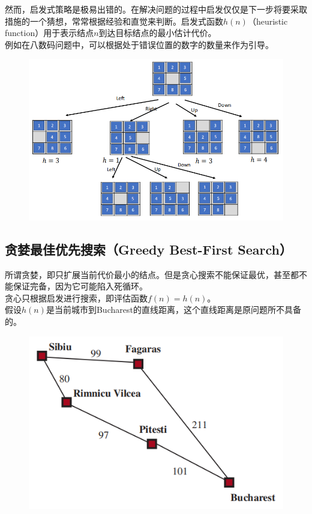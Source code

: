 然而，启发式策略是极易出错的。在解决问题的过程中启发仅仅是下一步将要采取措施的一个猜想，常常根据经验和直觉来判断。启发式函数$ h(n) $（heuristic function）用于表示结点$ n $到达目标结点的最小估计代价。\\

例如在八数码问题中，可以根据处于错误位置的数字的数量来作为引导。\\

\begin{figure}[H]
    \centering
    \includegraphics[scale=0.8]{img/C1/1-5/1.png}
\end{figure}

\vspace{0.5cm}

\subsection{贪婪最佳优先搜索（Greedy Best-First Search）}

所谓贪婪，即只扩展当前代价最小的结点。但是贪心搜索不能保证最优，甚至都不能保证完备，因为它可能陷入死循环。\\

贪心只根据启发进行搜索，即评估函数$ f(n) = h(n) $。\\

假设$ h(n) $是当前城市到Bucharest的直线距离，这个直线距离是原问题所不具备的。

\begin{figure}[H]
    \centering
    \includegraphics{img/C1/1-5/2.png}
\end{figure}

